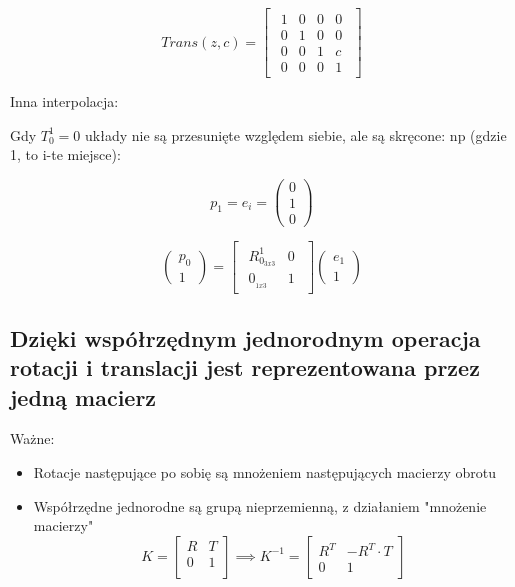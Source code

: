 \documentclass{article}
\begin{document}
\Large
$$
    Trans(z, c) =
    \begin{bmatrix}
        \begin{array}{ccc|c}
            1 & 0 & 0 & 0 \\[0.3em]
            0 & 1 & 0 & 0 \\[0.3em]
            0 & 0 & 1 & c \\[0.3em]
            \hline
            0 & 0 & 0 & 1
        \end{array}
    \end{bmatrix}
$$
\normalsize


Inna interpolacja:

Gdy $T_{0}^{1} = 0$ układy nie są przesunięte względem siebie, ale są skręcone:
np (gdzie 1, to i-te miejsce):

\Large
$$
    p_{1}=e_{i}=\begin{pmatrix}
        0 \\
        1 \\
        0
    \end{pmatrix}
$$

$$
    \begin{pmatrix}
        p_{0} \\
        1
    \end{pmatrix}
    =
    \begin{bmatrix}
        \begin{array}{c|c}
            R_{0_{3x3}}^{1} & 0 \\[0.3em]
            \hline
            0_{_{1x3}}      & 1
        \end{array}
    \end{bmatrix}
    \begin{pmatrix}
        e_{1} \\
        1
    \end{pmatrix}
$$
\normalsize

\newpage

\subsection{Dzięki współrzędnym jednorodnym operacja rotacji i translacji jest reprezentowana przez jedną macierz}

Ważne:

\begin{itemize}
    \item Rotacje następujące po sobię są mnożeniem następujących macierzy obrotu
    \item Współrzędne jednorodne są grupą nieprzemienną, z działaniem "mnożenie macierzy"
          $$
              K =
              \begin{bmatrix}
                  R & T \\[0.3em]
                  0 & 1 \\[0.3em]
              \end{bmatrix}
              \implies
              K^{-1} =
              \begin{bmatrix}
                  R^{T} & -R^{T} \cdot T \\[0.3em]
                  0     & 1
              \end{bmatrix}
          $$
\end{itemize}
\end{document}
